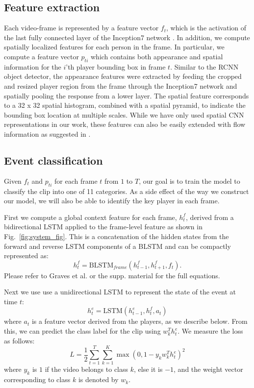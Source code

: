 \subsection{Feature extraction}
\label{sec:feature_extraction}
Each video-frame is represented by a feature vector $f_t$, which is the
activation of the last fully connected layer of the Inception7 network
\cite{Ioffe_arxiv15,Inception7}.  In addition, we compute spatially localized
features for each person in the frame. In particular, we compute a feature
vector $p_{ti}$ which contains both appearance and spatial information for the
$i$'th player bounding box in frame $t$.
Similar to the RCNN object
detector\cite{}, the appearance features were extracted by feeding the cropped
and resized player region from the frame through the Inception7 network and
spatially pooling the response from a lower layer. The spatial feature
corresponds to a 32 x 32 spatial histogram, combined with a spatial pyramid, to
indicate the bounding box location at multiple scales.
While we have only used spatial CNN representations in our
work, these features can also be easily extended with flow information as
suggested in \cite{Simonyan_NIPS14}.

\subsection{Event classification}

Given $f_t$ and $p_{ti}$ for each frame $t$ from $1$ to $T$, our goal
is to train the model to classify the clip into one of 11 categories. As a side
effect of the way we construct our model, we will also be able to identify the
key player in each frame.

First we compute a global context feature for each frame, $h_t^f$, derived from
a bidirectional LSTM applied to the frame-level feature as shown in Fig.~\ref{fig:system_fig}.
This is a concatenation of the hidden states from the forward and reverse LSTM
components of a BLSTM and can be compactly represented as:
\[
  h_t^f = \mbox{BLSTM}_{frame}(h_{t-1}^f, h_{t+1}^f, f_t).
\]Please refer to Graves et al. \cite{Graves_2013} or the supp. material
for the full equations.

Next we use use a unidirectional LSTM to represent the state of the
event at time $t$:
\begin{equation}
  \label{eq:event_lstm}
h_t^e = \mbox{LSTM}(h_{t-1}^e, h_t^f, a_t)
\end{equation}
where $a_t$ is a feature vector derived from the players, as we
describe below.
From this, we can predict the class label for the clip using $w_k^T
h_t^e$. We measure the loss as follows:
\begin{equation}
  L =   \frac{1}{2} \sum_{t=1}^T \sum_{k = 1}^K \max (0, 1 - y_k w_k^T h^e_t)^2
\end{equation} 
where $y_k$ is $1$ if the video belongs to class $k$,
else it is $-1$, and the weight vector corresponding to
class $k$ is denoted by $w_k$.

